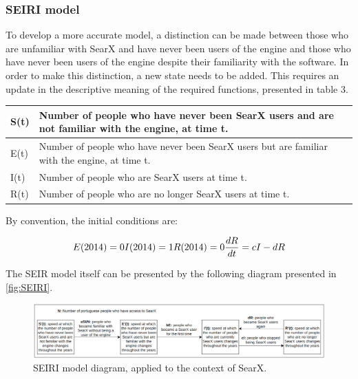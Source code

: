 \documentclass{article}
\begin{document}
\subsubsection{SEIRI model}

To ‌‌develop‌‌ a‌‌ more‌‌ accurate‌‌ model,‌‌ a‌‌ distinction‌‌ can‌‌ be‌‌ made‌‌ between‌‌ those‌‌ who‌‌ are‌‌ unfamiliar‌‌ with‌‌ SearX‌‌ and‌‌ have‌‌ never‌‌ been‌‌ users‌‌ of‌‌ the‌‌ engine ‌‌and‌‌ those‌‌ who‌‌ have‌‌ never‌‌ been‌‌ users‌‌ of‌‌ the‌ ‌engine‌ ‌despite‌ ‌their‌ ‌familiarity‌ ‌with‌ ‌the‌ ‌software.‌ ‌In‌ ‌order‌ ‌to‌ ‌make‌ ‌this‌‌ distinction,‌‌ a‌‌ new‌‌ state‌ ‌needs‌ ‌to‌ ‌be‌ ‌added.‌ ‌This‌ ‌requires‌ ‌an‌ ‌update‌ ‌in‌ ‌the‌ ‌descriptive‌ ‌meaning‌ ‌of‌ ‌the‌ ‌required‌‌
functions,‌ ‌presented‌ ‌in‌ ‌table‌ ‌3.‌

\begin{tabularx}{1\textwidth} { 
    | >{\centering\arraybackslash}X 
    || >{\centering\arraybackslash}X | }
   \hline
   S(t) & Number‌ ‌of‌ ‌people‌ ‌who‌ ‌have‌ ‌never‌ ‌been‌ ‌SearX‌ ‌users‌ ‌and‌ ‌are‌ ‌not‌ ‌familiar‌ ‌with‌‌ the‌ ‌engine,‌ ‌at‌ ‌time‌ ‌t.‌ ‌‌ ‌\\
   \hline
   E(t) & Number‌ ‌of‌ ‌people‌ ‌who‌ ‌have‌ ‌never‌ ‌been‌ ‌SearX‌ ‌users‌ ‌but‌ ‌are‌ ‌familiar‌ ‌with‌ ‌the‌‌ engine,‌ ‌at‌ ‌time‌ ‌t.‌ ‌\\
   \hline
   I(t)  & Number‌ ‌of‌ ‌people‌ ‌who‌ ‌are‌ ‌SearX‌ ‌users‌ ‌at‌ ‌time‌ ‌t.‌ ‌‌ \\
   \hline
   R(t)  & Number‌ ‌of‌ ‌people‌ ‌who‌ ‌are‌ ‌no‌ ‌longer‌ ‌SearX‌ ‌users‌ ‌at‌ ‌time‌ ‌t.‌ ‌‌ \\
  \hline
\end{tabularx}

By‌ ‌convention,‌ ‌the‌ ‌initial‌ ‌conditions‌ ‌are:‌‌

\begin{equation}
    \begin{subequations}
        E(2014) = 0
        I(2014) = 1
        R(2014) = 0
        \frac{dR}{dt} = cI - dR
    \end{subequations}
    \label{eq:SEIRIinitialConditions}
\end{equation}

The‌ ‌SEIR‌ ‌model‌ ‌itself‌ ‌can‌ ‌be‌ ‌presented‌ ‌by‌ ‌the‌ ‌following‌ ‌diagram‌ ‌presented‌ ‌in‌ \autoref{fig:SEIRI}.‌

\begin{figure}[h]
    \centering
    \includegraphics[width=1\linewidth]{SEIRI}
    \caption{SEIRI‌ ‌model‌ ‌diagram,‌ ‌applied‌ ‌to‌ ‌the‌ ‌context‌ ‌of‌ ‌SearX.‌}
    \label{fig:SEIRI}
\end{figure}
\end{document}
